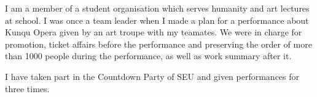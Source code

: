 \vspace{-6.0mm}

\begin{cventries}
\cvpapers
{
    \begin{cvitems}
    \item {I am a member of a student organisation which serves humanity and art lectures at school. I was once a team leader when I made a plan for a performance about Kunqu Opera given by an art troupe with my teamates. We were in charge for promotion, ticket affairs before the performance and preserving the order of more than 1000 people during the performance, as well as work summary after it.}
    \item {I have taken part in the Countdown Party of SEU and given performances for three times.}
    \end{cvitems}
}
\end{cventries}